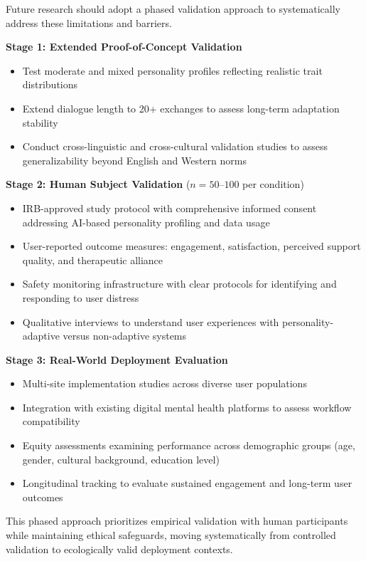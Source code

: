 \documentclass[apajournal,article,submit,moreauthors]{Definitions/mdpi}
\providecommand\tightlist{}
\begin{document}
Future research should adopt a phased validation approach to systematically address these limitations and barriers.

\textbf{Stage 1: Extended Proof-of-Concept Validation}
\begin{itemize}
\tightlist
\item Test moderate and mixed personality profiles reflecting realistic trait distributions
\item Extend dialogue length to 20+ exchanges to assess long-term adaptation stability
\item Conduct cross-linguistic and cross-cultural validation studies to assess generalizability beyond English and Western norms
\end{itemize}

\textbf{Stage 2: Human Subject Validation} ($n = 50$--$100$ per condition)
\begin{itemize}
\tightlist
\item IRB-approved study protocol with comprehensive informed consent addressing AI-based personality profiling and data usage
\item User-reported outcome measures: engagement, satisfaction, perceived support quality, and therapeutic alliance
\item Safety monitoring infrastructure with clear protocols for identifying and responding to user distress
\item Qualitative interviews to understand user experiences with personality-adaptive versus non-adaptive systems
\end{itemize}

\textbf{Stage 3: Real-World Deployment Evaluation}
\begin{itemize}
\tightlist
\item Multi-site implementation studies across diverse user populations
\item Integration with existing digital mental health platforms to assess workflow compatibility
\item Equity assessments examining performance across demographic groups (age, gender, cultural background, education level)
\item Longitudinal tracking to evaluate sustained engagement and long-term user outcomes
\end{itemize}

This phased approach prioritizes empirical validation with human participants while maintaining ethical safeguards, moving systematically from controlled validation to ecologically valid deployment contexts.
\end{document}
